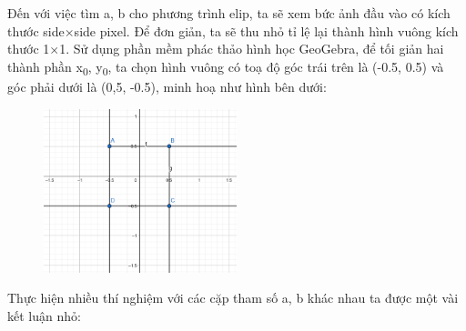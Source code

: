 \documentclass{article}
\begin{document}
Đến với việc tìm a, b cho phương trình elip, ta sẽ xem bức ảnh đầu vào có kích thước side$\times$side pixel. Để đơn giản, ta sẽ thu nhỏ tỉ lệ lại thành hình vuông kích thước 1$\times$1. Sử dụng phần mềm phác thảo hình học GeoGebra, để tối giản hai thành phần x\textsubscript 0, y\textsubscript 0, ta chọn hình vuông có toạ độ góc trái trên là (-0.5, 0.5) và góc phải dưới là (0,5, -0.5), minh hoạ như hình bên dưới:
\begin{figure}[!ht]
  \includegraphics[width = 0.5\textwidth]{image/square_illustrator.png}
\end{figure} \par
Thực hiện nhiều thí nghiệm với các cặp tham số a, b khác nhau ta được một vài kết luận nhỏ:
\end{document}
